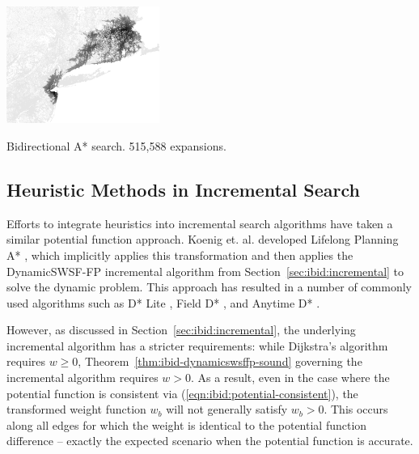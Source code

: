 \begin{marginfigure}%
   \centering%
   \includegraphics[width=5cm]{figs/incbi-road-ne/singleshot/example-heurbidijkstra.png}%
   \caption{Bidirectional A* search.
      515,588 expansions.}%
   \label{fig:ibid:example-heurbidijkstra}%
\end{marginfigure}


\subsection{Heuristic Methods in Incremental Search}
\label{subsec:ibid:heuristic-incremental}

Efforts to integrate heuristics into incremental search algorithms
have taken a similar potential function approach.
Koenig et. al. developed Lifelong Planning A* \citep{koenig2004lpastar},
which implicitly applies this transformation
and then applies the DynamicSWSF-FP incremental algorithm
\citep{ramalingam1996dynamicswsffp}
from Section~\ref{sec:ibid:incremental}
to solve the dynamic problem.
This approach has resulted in a number of commonly used algorithms
such as D* Lite \citep{koenig2002dstarlite},
Field D* \citep{ferguson2007fielddstar},
and Anytime D* \citep{likhachevetal2008anytimedynamic}.

However,
as discussed in Section~\ref{sec:ibid:incremental},
the underlying incremental algorithm has a stricter requirements:
while Dijkstra's algorithm requires $w \geq 0$,
Theorem~\ref{thm:ibid-dynamicswsffp-sound} governing
the incremental algorithm requires $w > 0$.
As a result,
even in the case where the potential function is consistent
via (\ref{eqn:ibid:potential-consistent}),
the transformed weight function $w_b$ will not generally satisfy
$w_b > 0$.
This occurs along all edges for which the weight is identical to
the potential function difference
-- exactly the expected scenario when the potential function is
accurate.

